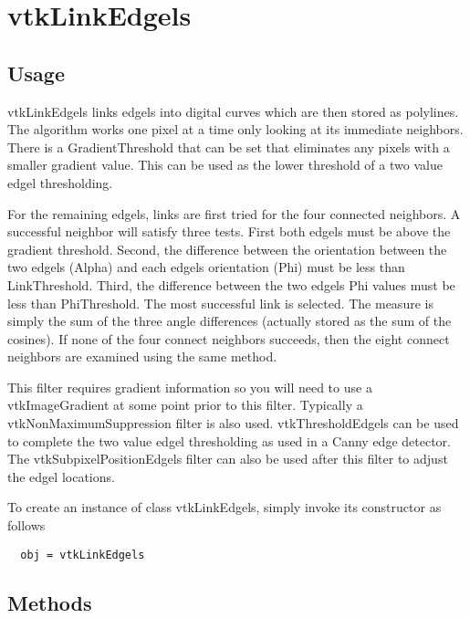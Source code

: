 \section{vtkLinkEdgels}

\subsection{Usage}

 vtkLinkEdgels links edgels into digital curves which are then stored 
 as polylines. The algorithm works one pixel at a time only looking at
 its immediate neighbors. There is a GradientThreshold that can be set 
 that eliminates any pixels with a smaller gradient value. This can
 be used as the lower threshold of a two value edgel thresholding. 

 For the remaining edgels, links are first tried for the four
 connected neighbors.  A successful neighbor will satisfy three
 tests. First both edgels must be above the gradient
 threshold. Second, the difference between the orientation between
 the two edgels (Alpha) and each edgels orientation (Phi) must be
 less than LinkThreshold. Third, the difference between the two
 edgels Phi values must be less than PhiThreshold.
 The most successful link is selected. The measure is simply the 
 sum of the three angle differences (actually stored as the sum of
 the cosines). If none of the four connect neighbors succeeds, then
 the eight connect neighbors are examined using the same method.
  
 This filter requires gradient information so you will need to use
 a vtkImageGradient at some point prior to this filter.  Typically
 a vtkNonMaximumSuppression filter is also used. vtkThresholdEdgels
 can be used to complete the two value edgel thresholding as used
 in a Canny edge detector. The vtkSubpixelPositionEdgels filter 
 can also be used after this filter to adjust the edgel locations.

To create an instance of class vtkLinkEdgels, simply
invoke its constructor as follows
\begin{verbatim}
  obj = vtkLinkEdgels
\end{verbatim}
\subsection{Methods}

